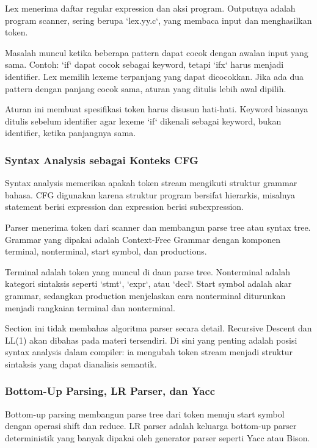 Lex menerima daftar regular expression dan aksi program. Outputnya adalah program scanner, sering berupa `lex.yy.c`, yang membaca input dan menghasilkan token.

Masalah muncul ketika beberapa pattern dapat cocok dengan awalan input yang sama. Contoh: `if` dapat cocok sebagai keyword, tetapi `ifx` harus menjadi identifier. Lex memilih lexeme terpanjang yang dapat dicocokkan. Jika ada dua pattern dengan panjang cocok sama, aturan yang ditulis lebih awal dipilih.

Aturan ini membuat spesifikasi token harus disusun hati-hati. Keyword biasanya ditulis sebelum identifier agar lexeme `if` dikenali sebagai keyword, bukan identifier, ketika panjangnya sama.

\subsubsection{Syntax Analysis sebagai Konteks CFG}

\begin{jawab}
Syntax analysis memeriksa apakah token stream mengikuti struktur grammar bahasa. CFG digunakan karena struktur program bersifat hierarkis, misalnya statement berisi expression dan expression berisi subexpression.
\end{jawab}

Parser menerima token dari scanner dan membangun parse tree atau syntax tree. Grammar yang dipakai adalah Context-Free Grammar dengan komponen terminal, nonterminal, start symbol, dan productions.

Terminal adalah token yang muncul di daun parse tree. Nonterminal adalah kategori sintaksis seperti `stmt`, `expr`, atau `decl`. Start symbol adalah akar grammar, sedangkan production menjelaskan cara nonterminal diturunkan menjadi rangkaian terminal dan nonterminal.

Section ini tidak membahas algoritma parser secara detail. Recursive Descent dan LL(1) akan dibahas pada materi tersendiri. Di sini yang penting adalah posisi syntax analysis dalam compiler: ia mengubah token stream menjadi struktur sintaksis yang dapat dianalisis semantik.

\subsubsection{Bottom-Up Parsing, LR Parser, dan Yacc}

\begin{jawab}
Bottom-up parsing membangun parse tree dari token menuju start symbol dengan operasi shift dan reduce. LR parser adalah keluarga bottom-up parser deterministik yang banyak dipakai oleh generator parser seperti Yacc atau Bison.
\end{jawab}

